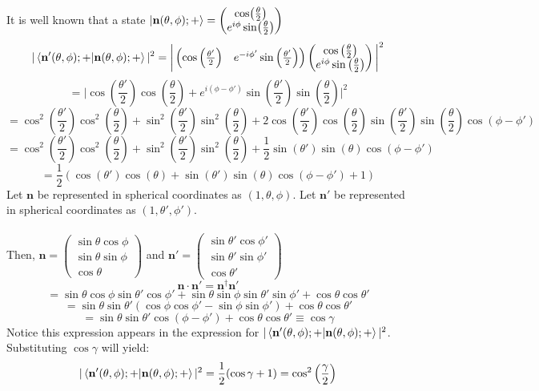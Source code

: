 \begin{sol}
It is well known that a state $\ket{\mathbf{n}(\theta,\phi);+}=\begin{pmatrix}\cos(\frac{\theta}{2})\\e^{i\phi}\sin(\frac{\theta}{2})\end{pmatrix}$ \\
$$|\braket{\mathbf{n'}(\theta,\phi);+}{\mathbf{n}(\theta,\phi);+}|^2=\bigg|\begin{pmatrix}\cos\left(\frac{\theta'}{2}\right)&e^{-i\phi'}\sin\left(\frac{\theta'}{2}\right)\end{pmatrix}\begin{pmatrix}\cos\left(\frac{\theta}{2}\right)\\e^{i\phi}\sin\left(\frac{\theta}{2}\right)\end{pmatrix}\bigg|^2$$
$$=\bigg|\cos\left(\frac{\theta'}{2}\right)\cos\left(\frac{\theta}{2}\right)+e^{i(\phi-\phi')}\sin\left(\frac{\theta'}{2}\right)\sin\left(\frac{\theta}{2}\right)\bigg|^2$$
$$=\cos^2\left(\frac{\theta'}{2}\right)\cos^2\left(\frac{\theta}{2}\right)+\sin^2\left(\frac{\theta'}{2}\right)\sin^2\left(\frac{\theta}{2}\right)+2\cos\left(\frac{\theta'}{2}\right)\cos\left(\frac{\theta}{2}\right)\sin\left(\frac{\theta'}{2}\right)\sin\left(\frac{\theta}{2}\right)\cos(\phi-\phi')$$ 
$$=\cos^2\left(\frac{\theta'}{2}\right)\cos^2\left(\frac{\theta}{2}\right)+\sin^2\left(\frac{\theta'}{2}\right)\sin^2\left(\frac{\theta}{2}\right)+\frac{1}{2}\sin\left(\theta'\right)\sin\left(\theta\right)\cos(\phi-\phi')$$
$$=\frac{1}{2}(\cos(\theta')\cos(\theta)+\sin(\theta')\sin(\theta)\cos(\phi-\phi')+1)$$ 
Let $\mathbf{n}$ be represented in spherical coordinates as $(1,\theta,\phi)$. Let $\mathbf{n'}$ be represented in spherical coordinates as $(1,\theta',\phi')$.\\\\
Then, $\mathbf{n}=\begin{pmatrix}\sin\theta\cos\phi\\\sin\theta\sin\phi\\\cos\theta\end{pmatrix}$ and $\mathbf{n'}=\begin{pmatrix}\sin\theta'\cos\phi'\\\sin\theta'\sin\phi'\\\cos\theta'\end{pmatrix}$
$$\mathbf{n}\cdot\mathbf{n'}=\mathbf{n}^\dagger\mathbf{n}'$$
$$=\sin\theta\cos\phi\sin\theta'\cos\phi'+\sin\theta\sin\phi\sin\theta'\sin\phi'+\cos\theta\cos\theta'$$ 
$$=\sin\theta\sin\theta'(\cos\phi\cos\phi'-\sin\phi\sin\phi')+\cos\theta\cos\theta'$$ 
$$=\sin\theta\sin\theta'\cos(\phi-\phi')+\cos\theta\cos\theta'\equiv\cos\gamma$$ 
Notice this expression appears in the expression for $|\braket{\mathbf{n'}(\theta,\phi);+}{\mathbf{n}(\theta,\phi);+}|^2$. Substituting $\cos\gamma$ will yield:
$$|\braket{\mathbf{n'}(\theta,\phi);+}{\mathbf{n}(\theta,\phi);+}|^2=\frac{1}{2}(\cos\gamma+1)=\cos^2\left(\frac{\gamma}{2}\right)$$ 
\end{sol}